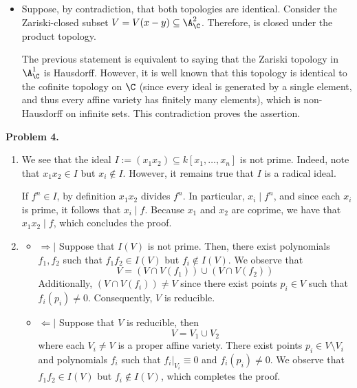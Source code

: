 \documentclass{article}
\begin{document}
\begin{itemize}
    \item[(b)] Suppose, by contradiction, that both topologies are identical. Consider 
    the Zariski-closed subset $V=V(x-y)\subseteq\A^{2}_{\C}$. Therefore, is closed under the
    product topology.

    The previous statement is equivalent to saying that the Zariski topology in $\A^{1}_{\C}$ is
    Hausdorff. However, it is well known that this topology is identical to the cofinite topology 
    on $\C$ (since every ideal is generated by a single element, and thus every affine variety has 
    finitely many elements), which is non-Hausdorff on infinite sets. This contradiction proves 
    the assertion.
\end{itemize}

\vspace{5mm}
\noindent\textbf{Problem 4.}
\begin{enumerate}
    \item[(a)] We see that the ideal $I:=(x_{1}x_{2})\subseteq k[x_{1},\dots,x_{n}]$ is not prime. 
    Indeed, note that $x_{1}x_{2}\in I$ but $x_{i}\not\in I$. However, it remains true that $I$ is 
    a radical ideal.

    If $f^{n}\in I$, by definition $x_{1}x_{2}$ divides $f^{n}$. In particular, $x_{i}\mid f^{n}$, 
    and since each $x_{i}$ is prime, it follows that $x_{i}\mid f$. Because $x_{1}$ and $x_{2}$ 
    are coprime, we have that $x_{1}x_{2}\mid f$, which concludes the proof.

    \item[(b)]
    \begin{itemize}
        \item $\Rightarrow|$ Suppose that $I(V)$ is not prime. Then, there exist polynomials
        $f_{1},f_{2}$ such that $f_{1}f_{2}\in I(V)$ but $f_{i}\not\in I(V)$. We observe that
        \begin{equation*}
            V=(V\cap V(f_{1}))\cup(V\cap V(f_{2}))
        \end{equation*}
        Additionally, $(V\cap V(f_{i}))\neq V$ since there exist points $p_{i}\in V$ such that 
        $f_{i}(p_{i})\neq0$. Consequently, $V$ is reducible.

        \item $\Leftarrow|$ Suppose that $V$ is reducible, then
        \begin{equation*}
            V=V_{1}\cup V_{2}
        \end{equation*}
        where each $V_{i}\neq V$ is a proper affine variety. There exist points 
        $p_{i}\in V\setminus V_{i}$ and polynomials $f_{i}$ such that $f_{i}|_{V_{i}}\equiv0$ and 
        $f_{i}(p_{i})\neq0$. We observe that $f_{1}f_{2}\in I(V)$ but $f_{i}\not\in I(V)$, which 
        completes the proof.
    \end{itemize}
\end{enumerate}
\end{document}
